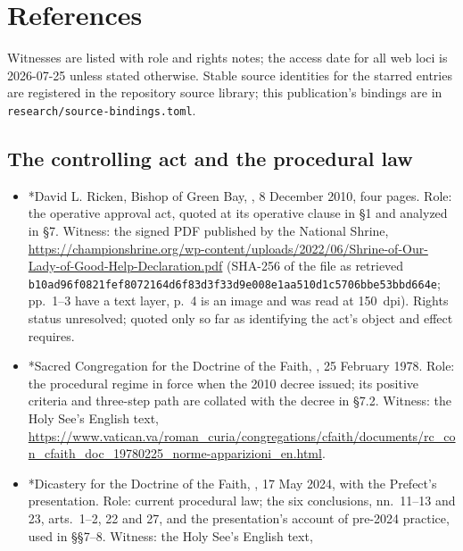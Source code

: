 \sectionguard
\section{References}

Witnesses are listed with role and rights notes; the access date for
all web loci is 2026-07-25 unless stated otherwise. Stable source
identities for the starred entries are registered in the repository
source library; this publication's bindings are in
\texttt{research/source-bindings.toml}.

\subsection*{The controlling act and the procedural law}

\begin{itemize}
\item *David L. Ricken, Bishop of Green Bay, , 8 December 2010, four pages. Role:
the operative approval act, quoted at its operative clause in \S1 and
analyzed in \S7. Witness: the signed PDF published by the National
Shrine,
\url{https://championshrine.org/wp-content/uploads/2022/06/Shrine-of-Our-Lady-of-Good-Help-Declaration.pdf}
(SHA-256 of the file as retrieved
\texttt{b10ad96f0821fef8072164d6f83d3f33d9e008e1aa510d1c5706bbe53bbd664e};
pp.~1--3 have a text layer, p.~4 is an image and was read at 150~dpi).
Rights status unresolved; quoted only so far as identifying the act's
object and effect requires.
\item *Sacred Congregation for the Doctrine of the Faith, , 25 February 1978. Role: the procedural
regime in force when the 2010 decree issued; its positive criteria and
three-step path are collated with the decree in \S7.2. Witness: the
Holy See's English text,
\url{https://www.vatican.va/roman_curia/congregations/cfaith/documents/rc_con_cfaith_doc_19780225_norme-apparizioni_en.html}.
\item *Dicastery for the Doctrine of the Faith, , 17
May 2024, with the Prefect's presentation. Role: current procedural
law; the six conclusions, nn.~11--13 and 23, arts.~1--2, 22 and 27, and
the presentation's account of pre-2024 practice, used in \S\S7--8.
Witness: the Holy See's English text,

\end{itemize}
